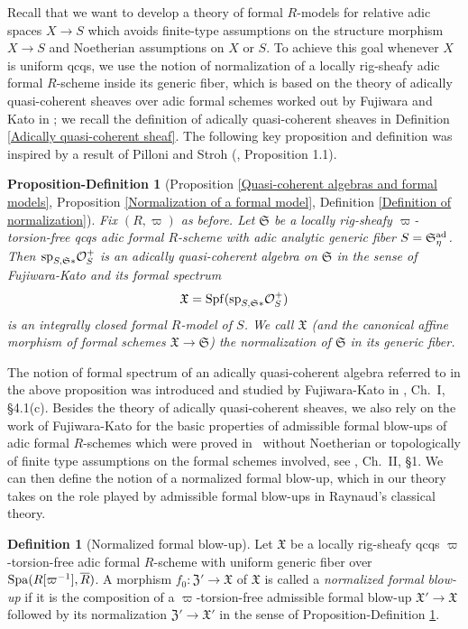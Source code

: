 \documentclass[12pt,twoside,a4paper]{article}
\newtheorem{prop-def}[thm]{Proposition-Definition}
\theoremstyle{definition}
\newtheorem{mydef}[thm]{Definition}
\theoremstyle{remark}
\newcommand\ad{{\rm ad}}
\newcommand\spc{{\rm sp}}
\newcommand\Spa{{\rm Spa}}
\newcommand\Spf{{\rm Spf}}
\begin{document}
Recall that we want to develop a theory of formal $R$-models for relative adic spaces $X\to S$ which avoids finite-type assumptions on the structure morphism $X\to S$ and Noetherian assumptions on $X$ or $S$. To achieve this goal whenever $X$ is uniform qcqs, we use the notion of normalization of a locally rig-sheafy adic formal $R$-scheme inside its generic fiber, which is based on the theory of adically quasi-coherent sheaves over adic formal schemes worked out by Fujiwara and Kato in \cite{FK}; we recall the definition of adically quasi-coherent sheaves in Definition \ref{Adically quasi-coherent sheaf}. The following key proposition and definition was inspired by a result of Pilloni and Stroh (\cite{Pilloni-Stroh16}, Proposition 1.1). 
\begin{prop-def}[Proposition \ref{Quasi-coherent algebras and formal models}, Proposition \ref{Normalization of a formal model}, Definition \ref{Definition of normalization}]\label{Normalization, introduction}Fix $(R, \varpi)$ as before. Let $\mathfrak{S}$ be a locally rig-sheafy $\varpi$-torsion-free qcqs adic formal $R$-scheme with adic analytic generic fiber $S=\mathfrak{S}_{\eta}^{\ad}$. Then $\spc_{S,\mathfrak{S}\ast}\mathcal{O}_{S}^{+}$ is an adically quasi-coherent algebra on $\mathfrak{S}$ in the sense of Fujiwara-Kato and its formal spectrum \begin{equation*}\mathfrak{X}=\Spf(\spc_{S,\mathfrak{S}\ast}\mathcal{O}_{S}^{+})\end{equation*}is an integrally closed formal $R$-model of $S$. We call $\mathfrak{X}$ (and the canonical affine morphism of formal schemes $\mathfrak{X}\to\mathfrak{S}$) the normalization of $\mathfrak{S}$ in its generic fiber.\end{prop-def}
The notion of formal spectrum of an adically quasi-coherent algebra referred to in the above proposition was introduced and studied by Fujiwara-Kato in \cite{FK}, Ch.~I, \S4.1(c). Besides the theory of adically quasi-coherent sheaves, we also rely on the work of Fujiwara-Kato for the basic properties of admissible formal blow-ups of adic formal $R$-schemes which were proved in \cite{FK} without Noetherian or topologically of finite type assumptions on the formal schemes involved, see \cite{FK}, Ch.~II, \S1. We can then define the notion of a normalized formal blow-up, which in our theory takes on the role played by admissible formal blow-ups in Raynaud's classical theory.
\begin{mydef}[Normalized formal blow-up]\label{Normalized formal blow-up, introduction}Let $\mathfrak{X}$ be a locally rig-sheafy qcqs $\varpi$-torsion-free adic formal $R$-scheme with uniform generic fiber over $\Spa(R[\varpi^{-1}], \overline{R})$. A morphism $f_{0}: \mathfrak{Z}'\to\mathfrak{X}$ of $\mathfrak{X}$ is called a \textit{normalized formal blow-up} if it is the composition of a $\varpi$-torsion-free admissible formal blow-up $\mathfrak{X}'\to\mathfrak{X}$ followed by its normalization $\mathfrak{Z}'\to\mathfrak{X}'$ in the sense of Proposition-Definition \ref{Normalization, introduction}.\end{mydef}
\end{document}
